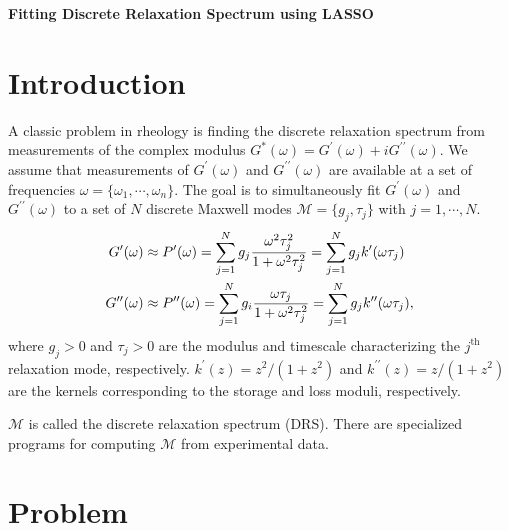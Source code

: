 \documentclass[11pt,letterpaper]{article}
\newcommand{\Gp}{G^{\prime}(\omega)}
\newcommand{\Gpp}{G^{\prime\prime}(\omega)}
\newcommand{\Gst}{G^{*}(\omega)}
\begin{document}
\begin{center}
\Huge{\textbf{Fitting Discrete Relaxation Spectrum using LASSO}}\\
\end{center}

\tableofcontents

\bigskip

\section{Introduction}

A classic problem in rheology is finding the discrete relaxation spectrum from measurements of the complex modulus $\Gst = \Gp + i \Gpp$. We assume that measurements of $\Gp$ and $\Gpp$ are available at a set of frequencies $\omega = \{\omega_1, \cdots, \omega_n\}$. The goal is to
simultaneously fit $\Gp$ and $\Gpp$ to a set of $N$ discrete Maxwell modes $\mathcal{M} = \{g_j, \tau_j\}$ with $j = 1, \cdots, N$.
\begin{align}
\Gp &  \approx P^{\prime}(\omega) = \sum_{j=1}^{N} g_j \dfrac{\omega^2 \tau_j^2}{1 + \omega^2 \tau_j^2} = \sum_{j=1}^{N} g_j k^{\prime}(\omega \tau_j) \notag\\
\Gpp & \approx P^{\prime\prime}(\omega) = \sum_{j=1}^{N} g_i \dfrac{\omega \tau_j}{1 + \omega^2 \tau_j^2} = \sum_{j=1}^{N} g_j k^{\prime \prime}(\omega \tau_j),
\label{eqn:drs}
\end{align}
where $g_j > 0$ and $\tau_j > 0$ are the modulus and timescale characterizing the $j^\text{th}$ relaxation mode, respectively. $k^{\prime}(z) = z^2/(1+z^2)$ and $k^{\prime\prime}(z) = z/(1+z^2)$ are the kernels corresponding to the storage and loss moduli, respectively.

\medskip

$\mathcal{M}$ is called the discrete relaxation spectrum (DRS). There are specialized programs for computing $\mathcal{M}$ from experimental data. 

\section{Problem}
\end{document}
